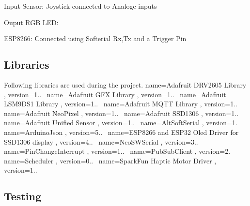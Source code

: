 \begin{DoxyEnumerate}
\item Input Sensor\+: Joystick connected to Analoge inputs~\newline

\item Ouput R\+GB L\+ED\+:~\newline

\item E\+S\+P8266\+: Connected using Softerial Rx,Tx and a Trigger Pin~\newline
 
\end{DoxyEnumerate}\hypertarget{index_libraries}{}\subsection{Libraries}\label{index_libraries}
Following libraries are used during the project. name=Adafruit D\+R\+V2605 Library , version=1..~\newline
name=Adafruit G\+FX Library , version=1..~\newline
name=Adafruit L\+S\+M9\+D\+S1 Library , version=1..~\newline
name=Adafruit M\+Q\+TT Library , version=1..~\newline
name=Adafruit Neo\+Pixel , version=1..~\newline
name=Adafruit S\+S\+D1306 , version=1..~\newline
name=Adafruit Unified Sensor , version=1..~\newline
name=Alt\+Soft\+Serial , version=1.~\newline
name=Arduino\+Json , version=5..~\newline
name=E\+S\+P8266 and E\+S\+P32 Oled Driver for S\+S\+D1306 display , version=4..~\newline
name=Neo\+S\+W\+Serial , version=3..~\newline
name=Pin\+Change\+Interrupt , version=1..~\newline
name=Pub\+Sub\+Client , version=2.~\newline
name=Scheduler , version=0..~\newline
name=Spark\+Fun Haptic Motor Driver , version=1..\hypertarget{index_testing}{}\subsection{Testing}\label{index_testing}
